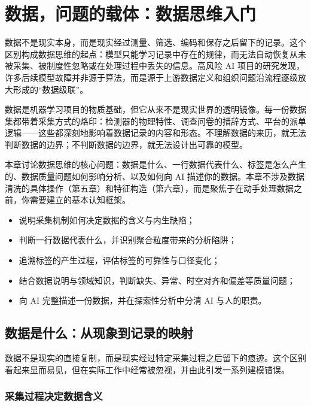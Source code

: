 ﻿\chapter{数据，问题的载体：数据思维入门}

数据不是现实本身，而是现实经过测量、筛选、编码和保存之后留下的记录。这个区别构成数据思维的起点：模型只能学习记录中存在的规律，而无法自动恢复从未被采集、被制度性忽略或在处理过程中丢失的信息。高风险 AI 项目的研究发现，许多后续模型故障并非源于算法，而是源于上游数据定义和组织问题沿流程逐级放大形成的“数据级联”\cite{sambasivan2021data}。

数据是机器学习项目的物质基础，但它从来不是现实世界的透明镜像。每一份数据集都带着采集方式的烙印：检测器的物理特性、调查问卷的措辞方式、平台的派单逻辑——这些都深刻地影响着数据记录的内容和形态。不理解数据的来历，就无法判断数据的边界；不判断数据的边界，就无法设计出可靠的模型。

本章讨论数据思维的核心问题：数据是什么、一行数据代表什么、标签是怎么产生的、数据质量问题如何影响分析、以及如何向 AI 描述你的数据。本章不涉及数据清洗的具体操作（第五章）和特征构造（第六章），而是聚焦于在动手处理数据之前，你需要建立的基本认知框架。

\begin{chapterguide}
\begin{itemize}
  \item 说明采集机制如何决定数据的含义与内生缺陷；
  \item 判断一行数据代表什么，并识别聚合粒度带来的分析陷阱；
  \item 追溯标签的产生过程，评估标签的可靠性与口径变化；
  \item 结合数据说明与领域知识，判断缺失、异常、时空对齐和偏差等质量问题；
  \item 向 AI 完整描述一份数据，并在探索性分析中分清 AI 与人的职责。
\end{itemize}
\end{chapterguide}

\section{数据是什么：从现象到记录的映射}

数据不是现实的直接复制，而是现实经过特定采集过程之后留下的痕迹。这个区别看起来显而易见，但在实际工作中经常被忽视，并由此引发一系列建模错误。

\subsection{采集过程决定数据含义}

